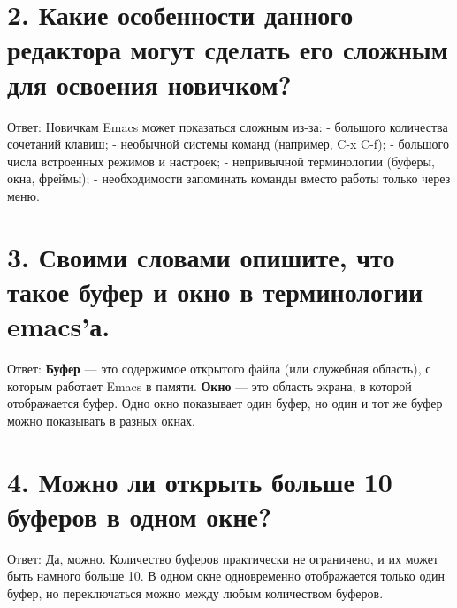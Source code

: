 \documentclass[
  english,
  russian,
  12pt,
  a4paper,
]{scrreprt}
\begin{document}
\section{2. Какие особенности данного редактора могут сделать его
сложным для освоения
новичком?}\label{ux43aux430ux43aux438ux435-ux43eux441ux43eux431ux435ux43dux43dux43eux441ux442ux438-ux434ux430ux43dux43dux43eux433ux43e-ux440ux435ux434ux430ux43aux442ux43eux440ux430-ux43cux43eux433ux443ux442-ux441ux434ux435ux43bux430ux442ux44c-ux435ux433ux43e-ux441ux43bux43eux436ux43dux44bux43c-ux434ux43bux44f-ux43eux441ux432ux43eux435ux43dux438ux44f-ux43dux43eux432ux438ux447ux43aux43eux43c}

Ответ: Новичкам Emacs может показаться сложным из-за: - большого
количества сочетаний клавиш; - необычной системы команд (например, C-x
C-f); - большого числа встроенных режимов и настроек; - непривычной
терминологии (буферы, окна, фреймы); - необходимости запоминать команды
вместо работы только через меню.

\section{3. Своими словами опишите, что такое буфер и окно в
терминологии
emacs'а.}\label{ux441ux432ux43eux438ux43cux438-ux441ux43bux43eux432ux430ux43cux438-ux43eux43fux438ux448ux438ux442ux435-ux447ux442ux43e-ux442ux430ux43aux43eux435-ux431ux443ux444ux435ux440-ux438-ux43eux43aux43dux43e-ux432-ux442ux435ux440ux43cux438ux43dux43eux43bux43eux433ux438ux438-emacsux430.}

Ответ: \textbf{Буфер} --- это содержимое открытого файла (или служебная
область), с которым работает Emacs в памяти. \textbf{Окно} --- это
область экрана, в которой отображается буфер. Одно окно показывает один
буфер, но один и тот же буфер можно показывать в разных окнах.

\section{4. Можно ли открыть больше 10 буферов в одном
окне?}\label{ux43cux43eux436ux43dux43e-ux43bux438-ux43eux442ux43aux440ux44bux442ux44c-ux431ux43eux43bux44cux448ux435-10-ux431ux443ux444ux435ux440ux43eux432-ux432-ux43eux434ux43dux43eux43c-ux43eux43aux43dux435}

Ответ: Да, можно. Количество буферов практически не ограничено, и их
может быть намного больше 10. В одном окне одновременно отображается
только один буфер, но переключаться можно между любым количеством
буферов.
\end{document}
